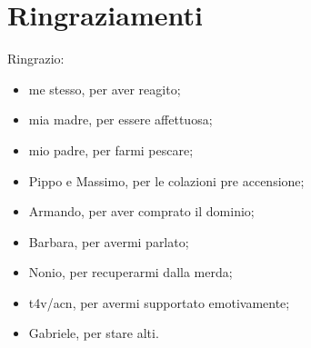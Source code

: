 \chapter*{Ringraziamenti}

Ringrazio:
\begin{itemize}
  \item me stesso, per aver reagito;
  \item mia madre, per essere affettuosa;
  \item mio padre, per farmi pescare;
  \item Pippo e Massimo, per le colazioni pre accensione;
  \item Armando, per aver comprato il dominio;
  \item Barbara, per avermi parlato;
  \item Nonio, per recuperarmi dalla merda;
  \item t4v/acn, per avermi supportato emotivamente;
  \item Gabriele, per stare alti.
\end{itemize}
